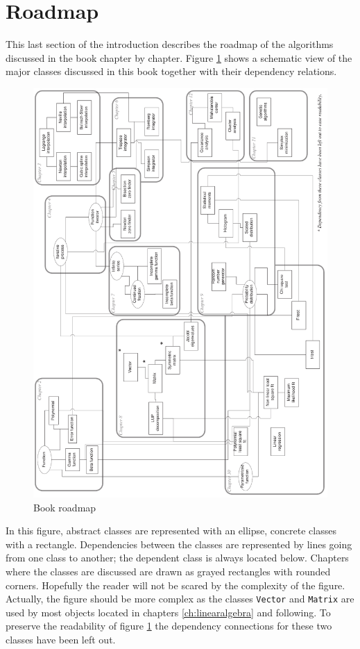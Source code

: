 \documentclass[twoside]{book}
\begin{document}
\section{Roadmap}
This last section of the introduction describes the roadmap of
the algorithms discussed in the book chapter by chapter. Figure
\ref{fig:roadmap} shows a schematic view of the major classes
discussed in this book together with their dependency relations.
\begin{figure}
\centering\includegraphics[width=13cm]{Figures/Roadmap}
\caption{Book roadmap} \label{fig:roadmap}
\end{figure}
In this figure, abstract classes are represented with an ellipse,
concrete classes with a rectangle. Dependencies between the
classes are represented by lines going from one class to another;
the dependent class is always located below. Chapters where the
classes are discussed are drawn as grayed rectangles with rounded
corners. Hopefully the reader will not be scared by the complexity
of the figure. Actually, the figure should be more complex as the
classes {\tt Vector} and {\tt Matrix} are used by most objects
located in chapters \ref{ch:linearalgebra} and following. To
preserve the readability of figure \ref{fig:roadmap} the
dependency connections for these two classes have been left out.
\end{document}
